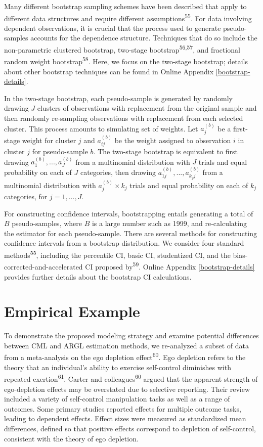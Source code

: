 \documentclass[
  man, donotrepeattitle,floatsintext]{apa7}
\begin{document}
Many different bootstrap sampling schemes have been described that apply to different data structures and require different assumptions\textsuperscript{55}.
For data involving dependent observations, it is crucial that the process used to generate pseudo-samples accounts for the dependence structure.
Techniques that do so include the non-parametric clustered bootstrap, two-stage bootstrap\textsuperscript{56,57}, and fractional random weight bootstrap\textsuperscript{58}.
Here, we focus on the two-stage bootstrap; details about other bootstrap techniques can be found in Online Appendix \ref{bootstrap-details}.

In the two-stage bootstrap, each pseudo-sample is generated by randomly drawing \(J\) clusters of observations with replacement from the original sample and then randomly re-sampling observations with replacement from each selected cluster.
This process amounts to simulating set of weights. Let \(a_j^{(b)}\) be a first-stage weight for cluster \(j\) and \(a_{ij}^{(b)}\) be the weight assigned to observation \(i\) in cluster \(j\) for pseudo-sample \(b\).
The two-stage bootstrap is equivalent to first drawing \(a_1^{(b)},...,a_J^{(b)}\) from a multinomial distribution with \(J\) trials and equal probability on each of \(J\) categories, then drawing \(a_{1j}^{(b)},...,a_{k_j j}^{(b)}\) from a multinomial distribution with \(a_j^{(b)} \times k_j\) trials and equal probability on each of \(k_j\) categories, for \(j = 1,...,J\).

For constructing confidence intervals, bootstrapping entails generating a total of \(B\) pseudo-samples, where \(B\) is a large number such as 1999, and re-calculating the estimator for each pseudo-sample.
There are several methods for constructing confidence intervals from a bootstrap distribution.
We consider four standard methods\textsuperscript{55}, including the percentile CI, basic CI, studentized CI, and the bias-corrected-and-accelerated CI proposed by\textsuperscript{59}.
Online Appendix \ref{bootstrap-details} provides further details about the bootstrap CI calculations.

\section{Empirical Example}\label{empirical-example}

To demonstrate the proposed modeling strategy and examine potential differences between CML and ARGL estimation methods, we re-analyzed a subset of data from a meta-analysis on the ego depletion effect\textsuperscript{60}.
Ego depletion refers to the theory that an individual's ability to exercise self-control diminishes with repeated exertion\textsuperscript{61}.
Carter and colleagues\textsuperscript{60} argued that the apparent strength of ego-depletion effects may be overstated due to selective reporting.
Their review included a variety of self-control manipulation tasks as well as a range of outcomes.
Some primary studies reported effects for multiple outcome tasks, leading to dependent effects.
Effect sizes were measured as standardized mean differences, defined so that positive effects correspond to depletion of self-control, consistent with the theory of ego depletion.
\end{document}
